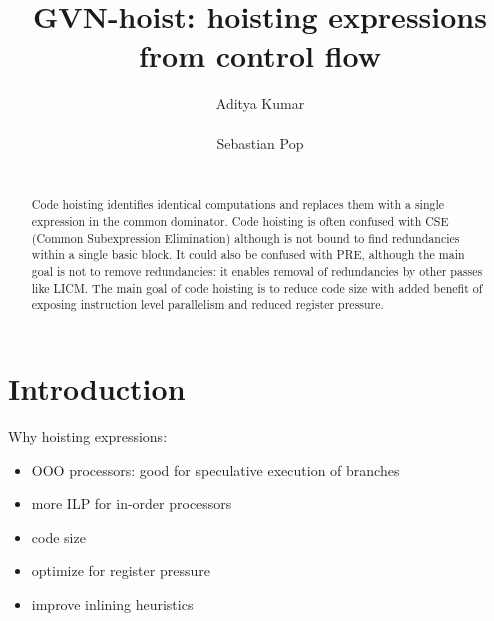 \documentclass{sig-alternate}
\begin{document}
\def \SCoP {SCoP}
\def \GCC {GCC}
\def \LLVM {LLVM}
\def \SESE {SESE}
\def \CFG {CFG}
\def \SSA {SSA}
\def \scev {scev}

\setlength{\pdfpageheight}{\paperheight}
\setlength{\pdfpagewidth}{\paperwidth}

\title{GVN-hoist: hoisting expressions from control flow}


\author{
\alignauthor
Aditya Kumar\\
       \\
\alignauthor
Sebastian Pop\\
       \\
}

\maketitle
\begin{abstract}
  Code hoisting identifies identical computations and replaces them with a
  single expression in the common dominator.  Code hoisting is often confused
  with CSE (Common Subexpression Elimination) although is not bound to find
  redundancies within a single basic block.  It could also be confused with PRE,
  although the main goal is not to remove redundancies: it enables removal of
  redundancies by other passes like LICM.  The main goal of code hoisting is to
  reduce code size with added benefit of exposing instruction level parallelism
  and reduced register pressure.
\end{abstract}

\section{Introduction}

Why hoisting expressions:
\begin{itemize}
\item OOO processors: good for speculative execution of branches
\item more ILP for in-order processors
\item code size
\item optimize for register pressure
\item improve inlining heuristics
\end{itemize}
\end{document}

